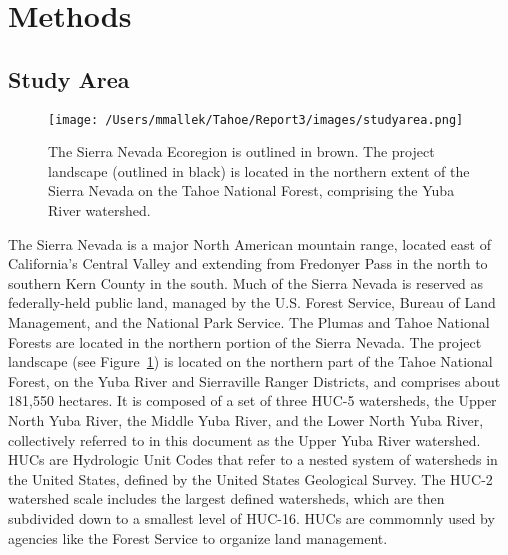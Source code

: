 
\section{Methods}
\label{sec:hrvmethods}
\subsection{Study Area}
\label{sec:studyarea}

\begin{figure}[!htbp]
\texttt{[image: /Users/mmallek/Tahoe/Report3/images/studyarea.png]}
\caption{The Sierra Nevada Ecoregion is outlined in brown. The project landscape (outlined in black) is located in the northern extent of the Sierra Nevada on the Tahoe National Forest, comprising the Yuba River watershed.}
\label{projectarea}
\end{figure}

The Sierra Nevada is a major North American mountain range, located east of California's Central Valley and extending from Fredonyer Pass in the north to southern Kern County in the south. Much of the Sierra Nevada is reserved as federally-held public land, managed by the U.S. Forest Service, Bureau of Land Management, and the National Park Service. The Plumas and Tahoe National Forests are located in the northern portion of the Sierra Nevada. The project landscape (see Figure~\ref{projectarea}) is located on the northern part of the Tahoe National Forest, on the Yuba River and Sierraville Ranger Districts, and comprises about 181,550 hectares. It is composed of a set of three HUC-5 watersheds, the Upper North Yuba River, the Middle Yuba River, and the Lower North Yuba River, collectively referred to in this document as the Upper Yuba River watershed. HUCs are Hydrologic Unit Codes that refer to a nested system of watersheds in the United States, defined by the United States Geological Survey. The HUC-2 watershed scale includes the largest defined watersheds, which are then subdivided down to a smallest level of HUC-16. HUCs are commomnly used by agencies like the Forest Service to organize land management.

